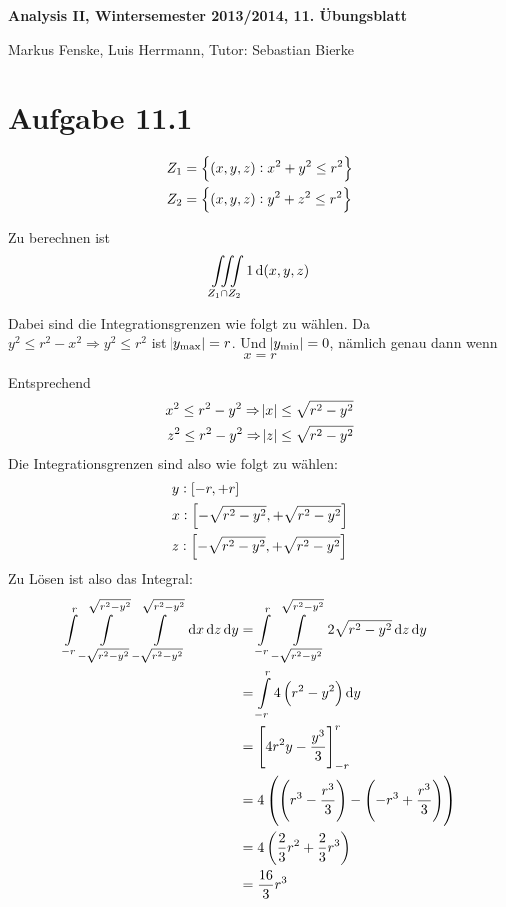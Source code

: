 \documentclass[a4paper,german,12pt,smallheadings]{scrartcl}
\begin{document}
\begin{center}
\bfseries %
\sffamily %
\vspace{-40pt}
Analysis II, Wintersemester 2013/2014, 11. Übungsblatt

Markus Fenske, Luis Herrmann, Tutor: Sebastian Bierke
\vspace{-10pt}
\end{center}
\allowdisplaybreaks %
\section*{Aufgabe 11.1}
\begin{align*}
  Z_1 &= \cbr{(x,y,z): x^2+y^2 \le r^2} \\
  Z_2 &= \cbr{(x,y,z): y^2+z^2 \le r^2}
\end{align*}

Zu berechnen ist
\begin{equation*}
  \iiint\limits_{Z_1 \cap Z_2} 1 \dif\del{x,y,z}
\end{equation*}

Dabei sind die Integrationsgrenzen wie folgt zu wählen. Da $y^2 \le r^2 - x^2
\Rightarrow y^2 \le r^2$ ist $\envert{y_\text{max}} = r$. Und $\envert{y_\text{min}} = 0$, nämlich genau dann wenn
\begin{equation*}
  x = r
\end{equation*}

Entsprechend
\begin{align*}
  x^2 \le r^2 - y^2 \Rightarrow \envert{x} &\le \sqrt{r^2 - y^2} \\
  z^2 \le r^2 - y^2 \Rightarrow \envert{z} &\le \sqrt{r^2 - y^2} \\
\end{align*}
Die Integrationsgrenzen sind also wie folgt zu wählen:
\begin{align*}
  &y: \sbr{-r, +r}\\
  &x: \sbr{- \sqrt{r^2 - y^2}, + \sqrt{r^2 - y^2}} \\
              &z: \sbr{- \sqrt{r^2 - y^2}, + \sqrt{r^2 - y^2}} \\
\end{align*}
Zu Lösen ist also das Integral:
\begin{align*}
  \int\limits_{-r}^r
  \int\limits_{-\sqrt{r^2 - y^2}}^{\sqrt{r^2 - y^2}}
  \int\limits_{-\sqrt{r^2 - y^2}}^{\sqrt{r^2 - y^2}}
  \dif x \dif z \dif y
  &=
  \int\limits_{-r}^r
  \int\limits_{-\sqrt{r^2 - y^2}}^{\sqrt{r^2 - y^2}}
  2 \sqrt{r^2 - y^2}
  \dif z \dif y \\
  &=
  \int\limits_{-r}^r
  4 \del{r^2 - y^2}
  \dif y \\
  &= \sbr{4r^2y - \frac{y^3}{3}}_{-r}^{r} \\
  &= 4 \del{\del{r^3 - \frac{r^3}{3}} - \del{-r^3 + \frac{r^3}{3}}} \\
  &= 4 \del{\frac{2}{3}r^2 + \frac{2}{3}r^3} \\
  &= \frac{16}{3} r^3
\end{align*}
\end{document}
